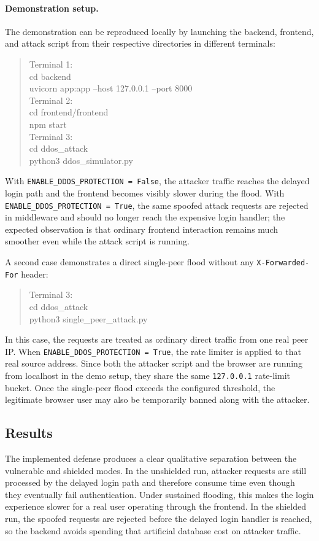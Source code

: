 \documentclass[11pt,a4paper]{article}
\begin{document}
\paragraph{Demonstration setup.}
The demonstration can be reproduced locally by launching the backend, frontend, and attack script from their respective directories in different terminals:
\begin{quote}
\small\ttfamily
Terminal 1:\\
cd backend \\
uvicorn app:app --host 127.0.0.1 --port 8000 \\[0.3em]
Terminal 2:\\
cd frontend/frontend \\
npm start \\[0.3em]
Terminal 3:\\
cd ddos\_attack \\
python3 ddos\_simulator.py
\end{quote}
With \texttt{ENABLE\_DDOS\_PROTECTION = False}, the attacker traffic reaches the delayed login path and the frontend becomes visibly slower during the flood. With \texttt{ENABLE\_DDOS\_PROTECTION = True}, the same spoofed attack requests are rejected in middleware and should no longer reach the expensive login handler; the expected observation is that ordinary frontend interaction remains much smoother even while the attack script is running.

A second case demonstrates a direct single-peer flood without any \texttt{X-Forwarded-For} header:
\begin{quote}
\small\ttfamily
Terminal 3:\\
cd ddos\_attack \\
python3 single\_peer\_attack.py
\end{quote}
In this case, the requests are treated as ordinary direct traffic from one real peer IP. When \texttt{ENABLE\_DDOS\_PROTECTION = True}, the rate limiter is applied to that real source address. Since both the attacker script and the browser are running from localhost in the demo setup, they share the same \texttt{127.0.0.1} rate-limit bucket. Once the single-peer flood exceeds the configured threshold, the legitimate browser user may also be temporarily banned along with the attacker.

\subsection{Results}

The implemented defense produces a clear qualitative separation between the vulnerable and shielded modes. In the unshielded run, attacker requests are still processed by the delayed login path and therefore consume time even though they eventually fail authentication. Under sustained flooding, this makes the login experience slower for a real user operating through the frontend. In the shielded run, the spoofed requests are rejected before the delayed login handler is reached, so the backend avoids spending that artificial database cost on attacker traffic.
\end{document}
